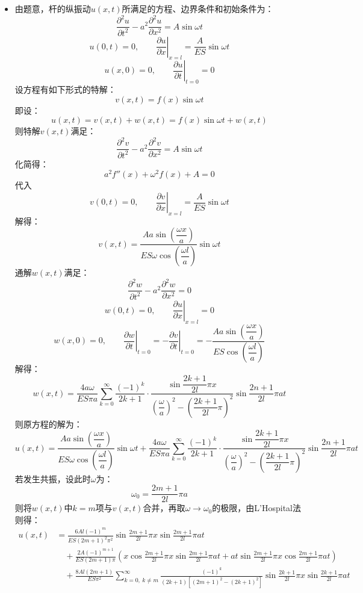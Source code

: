 \documentclass[a4paper,fontset=windows]{ctexart}
\begin{document}
\begin{itemize}
    \item[8.]
    由题意，杆的纵振动$u(x,t)$所满足的方程、边界条件和初始条件为：
    \[
    \frac{\partial^2 u}{\partial t^2} - a^2\frac{\partial^2 u}{\partial x^2} = A\sin\omega t
    \]
    \[
    u(0,t) = 0,\qquad \left.\frac{\partial u}{\partial x}\right|_{x=l} = \frac{A}{ES}\sin\omega t
    \]
    \[
    u(x,0) = 0,\qquad \left.\frac{\partial u}{\partial t}\right|_{t=0} = 0
    \]
    设方程有如下形式的特解：
    \[
    v(x,t) = f(x)\sin\omega t
    \]
    即设：
    \[
    u(x,t) = v(x,t) + w(x,t) = f(x)\sin\omega t + w(x,t)
    \]
    则特解$v(x,t)$满足：
    \[
    \frac{\partial^2 v}{\partial t^2} - a^2\frac{\partial^2 v}{\partial x^2} = A\sin\omega t
    \]
    化简得：
    \[
    a^2 f''(x) + \omega^2 f(x) + A = 0
    \]
    代入
    \[
    v(0,t) = 0,\qquad \left.\frac{\partial v}{\partial x}\right|_{x=l} = \frac{A}{ES}\sin\omega t
    \]
    解得：
    \[
    v(x,t) = \frac{Aa\sin\left(\dfrac{\omega x}{a}\right)}{ES\omega\cos\left(\dfrac{\omega l}{a}\right)}\sin\omega t
    \]
    通解$w(x,t)$满足：
    \[
    \frac{\partial^2 w}{\partial t^2} - a^2\frac{\partial^2 w}{\partial x^2} = 0
    \]
    \[
    w(0,t) = 0,\qquad \left.\frac{\partial u}{\partial x}\right|_{x=l} = 0
    \]
    \[
    w(x,0) = 0,\qquad \left.\frac{\partial w}{\partial t}\right|_{t=0} = -\left.\frac{\partial v}{\partial t}\right|_{t=0} = -\frac{Aa\sin\left(\dfrac{\omega x}{a}\right)}{ES\cos\left(\dfrac{\omega l}{a}\right)}
    \]
    解得：
    \[
    w(x,t) = \frac{4a\omega}{ES\pi a}\sum_{k=0}^{\infty}\frac{(-1)^k}{2k+1} \cdot \frac{\sin\dfrac{2k+1}{2l}\pi x}{\left(\dfrac{\omega}{a}\right)^2 - \left(\dfrac{2k+1}{2l}\pi\right)^2}\sin\frac{2n+1}{2l}\pi at
    \]
    则原方程的解为：
    \[
    u(x,t) = \frac{Aa\sin\left(\dfrac{\omega x}{a}\right)}{ES\omega\cos\left(\dfrac{\omega l}{a}\right)}\sin\omega t + \frac{4a\omega}{ES\pi a}\sum_{k=0}^{\infty}\frac{(-1)^k}{2k+1} \cdot \frac{\sin\dfrac{2k+1}{2l}\pi x}{\left(\dfrac{\omega}{a}\right)^2 - \left(\dfrac{2k+1}{2l}\pi\right)^2}\sin\frac{2n+1}{2l}\pi at
    \]
    若发生共振，设此时$\omega$为：
    \[
    \omega_0 = \dfrac{2m+1}{2l}\pi a
    \]
    则将$w(x,t)$中$k = m$项与$v(x,t)$合并，再取$\omega \to \omega_0$的极限，由L'Hospital法则得：
    \begin{align*}
    u(x,t)
    &= \frac{6Al(-1)^m}{ES(2m+1)^2\pi^2}\sin\frac{2m+1}{2l}\pi x\sin\frac{2m+1}{2l}\pi at \\
    &\quad + \frac{2A(-1)^{m+1}}{ES(2m+1)\pi}\left(x\cos\frac{2m+1}{2l}\pi x\sin\frac{2m+1}{2l}\pi at + at\sin\frac{2m+1}{2l}\pi x\cos\frac{2m+1}{2l}\pi at\right) \\
    &\quad + \frac{8Al(2m+1)}{ES\pi^2}\sum_{k=0,\: k \neq m}^{\infty}\frac{(-1)^k}{(2k+1)\left[(2m+1)^2-(2k+1)^2\right]}\sin\frac{2k+1}{2l}\pi x\sin\frac{2k+1}{2l}\pi at
    \end{align*}

    \end{itemize}
\end{document}
